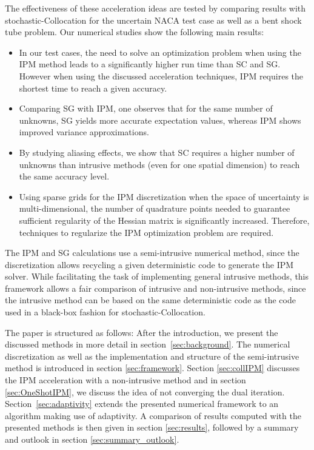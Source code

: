 The effectiveness of these acceleration ideas are tested by comparing results with stochastic-Collocation for the uncertain NACA test case as well as a bent shock tube problem. Our numerical studies show the following main results:
\begin{itemize}
\item In our test cases, the need to solve an optimization problem when using the IPM method leads to a significantly higher run time than SC and SG. However when using the discussed acceleration techniques, IPM requires the shortest time to reach a given accuracy.
\item Comparing SG with IPM, one observes that for the same number of unknowns, SG yields more accurate expectation values, whereas IPM shows improved variance approximations.
\item By studying aliasing effects, we show that SC requires a higher number of unknowns than intrusive methods (even for one spatial dimension) to reach the same accuracy level.
\item Using sparse grids for the IPM discretization when the space of uncertainty is multi-dimensional, the number of quadrature points needed to guarantee sufficient regularity of the Hessian matrix is significantly increased. Therefore, techniques to regularize the IPM optimization problem are required.
\end{itemize}
The IPM and SG calculations use a semi-intrusive numerical method, since the discretization allows recycling a given deterministic code to generate the IPM solver. While facilitating the task of implementing general intrusive methods, this framework allows a fair comparison of intrusive and non-intrusive methods, since the intrusive method can be based on the same deterministic code as the code used in a black-box fashion for stochastic-Collocation.

The paper is structured as follows: After the introduction, we present the discussed methods in more detail in section~\ref{sec:background}. The numerical discretization as well as the implementation and structure of the semi-intrusive method is introduced in section \ref{sec:framework}. Section \ref{sec:collIPM} discusses the IPM acceleration with a non-intrusive method and in section \ref{sec:OneShotIPM}, we discuss the idea of not converging the dual iteration. Section~\ref{sec:adaptivity} extends the presented numerical framework to an algorithm making use of adaptivity. A comparison of results computed with the presented methods is then given in section \ref{sec:results}, followed by a summary and outlook in section \ref{sec:summary_outlook}.

